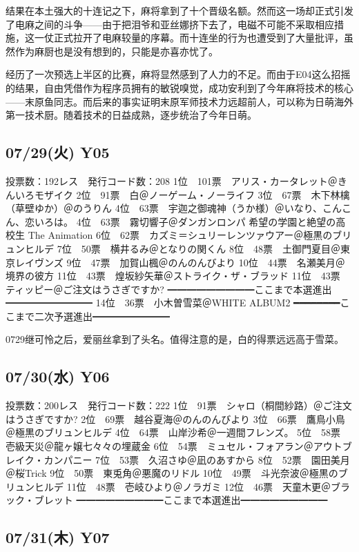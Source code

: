 结果在本土强大的十连记之下，麻将拿到了十个晋级名额。然而这一场却正式引发了电麻之间的斗争——由于把泪爷和亚丝娜挤下去了，电磁不可能不采取相应措施，这一仗正式拉开了电麻较量的序幕。而十连坐的行为也遭受到了大量批评，虽然作为麻厨也是没有想到的，只能是亦喜亦忧了。

经历了一次预选上半区的比赛，麻将显然感到了人力的不足。而由于E04这么招摇的结果，自由凭借作为程序员拥有的敏锐嗅觉，成功安利到了今年麻将技术的核心——末原鱼同志。而后来的事实证明末原军师技术力远超前人，可以称为日萌海外第一技术厨。随着技术的日益成熟，逐步统治了今年日萌。

\subsection{07/29(火) Y05}

	投票数：192レス　発行コード数：208
	1位　101票　アリス・カータレット＠きんいろモザイク
	2位　91票　白＠ノーゲーム・ノーライフ
	3位　67票　木下林檎（草壁ゆか）＠のうりん
	4位　63票　宇迦之御魂神（うか様）＠いなり、こんこん、恋いろは。
	4位　63票　霧切響子＠ダンガンロンパ 希望の学園と絶望の高校生 The Animation
	6位　62票　カズミ＝シュリーレンツァウアー＠極黒のブリュンヒルデ
	7位　50票　横井るみ＠となりの関くん
	8位　48票　土御門夏目＠東京レイヴンズ
	9位　47票　加賀山楓＠のんのんびより
	10位　44票　名瀬美月＠境界の彼方
	11位　43票　煌坂紗矢華＠ストライク・ザ・ブラッド
	11位　43票　ティッピー＠ご注文はうさぎですか?
	━━━━━━━━━ここまで本選進出━━━━━━━━━
	14位　36票　小木曽雪菜＠WHITE ALBUM2
	━━━━━━━━ここまで二次予選進出━━━━━━━━

0729继可怜之后，爱丽丝拿到了头名。值得注意的是，白的得票远远高于雪菜。

\subsection{07/30(水) Y06}

	投票数：200レス　発行コード数：222
	1位　91票　シャロ（桐間紗路）＠ご注文はうさぎですか?
	2位　69票　越谷夏海＠のんのんびより
	3位　66票　鷹鳥小鳥＠極黒のブリュンヒルデ
	4位　64票　山岸沙希＠一週間フレンズ。
	5位　58票　壱級天災＠龍ヶ嬢七々々の埋蔵金
	6位　54票　ミュセル・フォアラン＠アウトブレイク・カンパニー
	7位　53票　久沼さゆ＠凪のあすから
	8位　52票　園田美月＠桜Trick
	9位　50票　東兎角＠悪魔のリドル
	10位　49票　斗光奈波＠極黒のブリュンヒルデ
	11位　48票　壱岐ひより＠ノラガミ
	12位　46票　天童木更＠ブラック・ブレット
	━━━━━━━━━ここまで本選進出━━━━━━━━━

\subsection{07/31(木) Y07}

